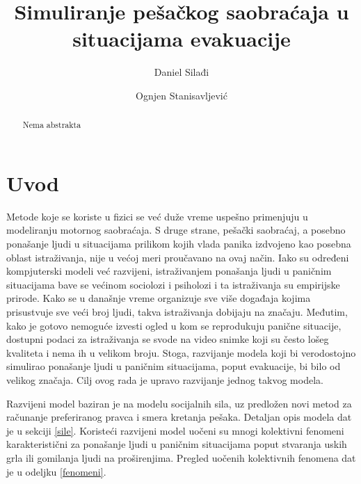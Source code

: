 \documentclass[12pt]{article}
\begin{document}
\title{\textbf{Simuliranje pešačkog saobraćaja u situacijama evakuacije}}

\author{
Daniel Silađi\\
\and
Ognjen Stanisavljević
}

\date{} %
\maketitle %


\begin{abstract}
Nema abstrakta
\end{abstract}


\section{Uvod}

Metode koje se koriste u fizici se već duže vreme uspešno primenjuju u  modeliranju motornog saobraćaja. S druge strane, pešački saobraćaj, a posebno ponašanje ljudi u situacijama prilikom kojih vlada panika izdvojeno kao posebna oblast istraživanja, nije u većoj meri proučavano na ovaj način. Iako su određeni kompjuterski modeli već razvijeni, istraživanjem ponašanja ljudi u paničnim situacijama bave  se većinom sociolozi i psiholozi i ta istraživanja su empirijske prirode. Kako se u današnje vreme organizuje sve više događaja kojima prisustvuje sve veći broj ljudi, takva istraživanja dobijaju na značaju. Međutim, kako je gotovo nemoguće izvesti ogled u kom se reprodukuju panične situacije, dostupni podaci za istraživanja se svode na video snimke koji su često lošeg kvaliteta i nema ih u velikom broju. Stoga, razvijanje modela koji bi verodostojno simulirao ponašanje ljudi u paničnim situacijama, poput evakuacije, bi bilo od velikog značaja. Cilj ovog rada je upravo razvijanje jednog takvog modela.

Razvijeni model baziran je na modelu socijalnih sila, uz predložen novi metod za računanje preferiranog pravca i smera kretanja pešaka. Detaljan opis modela dat je u sekciji \ref{sile}. Koristeći razvijeni model uočeni su mnogi kolektivni fenomeni karakteristični za ponašanje ljudi u paničnim situacijama poput stvaranja uskih grla ili gomilanja ljudi na proširenjima. Pregled uočenih kolektivnih fenomena dat je u odeljku \ref{fenomeni}. 
\end{document}
